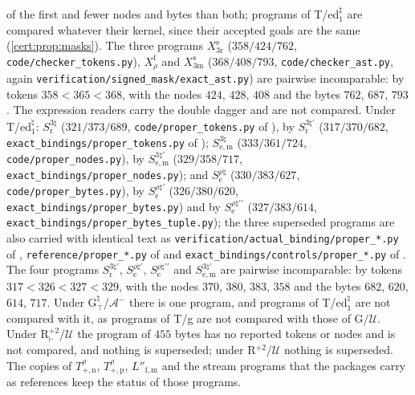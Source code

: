 of the first and fewer nodes and bytes than both; programs of T/ed$_1^{\sharp}$ are compared
whatever their kernel, since their accepted goals are the same
(\cref{cert:prop:masks}). The three programs $X^{\mathrm s}_{3\mathrm r}$ ($358/424/762$,
\texttt{code/checker\_tokens.py}), $X^{\mathrm f}_{\rho}$ and $X^{\mathrm s}_{3\mathrm m}$
($368/408/793$, \texttt{code/checker\_ast.py}, again
\texttt{verification/signed\_mask/exact\_ast.py}) are pairwise incomparable: by tokens
$358<365<368$, with the nodes $424$, $428$, $408$ and the bytes $762$, $687$, $793$. The
expression readers carry the double dagger and are not compared. Under
T/ed$_1^{\natural}$: $S^{3\natural}_{\mathrm r}$ ($321/373/689$, \texttt{code/proper\_tokens.py}
of ), by $S^{3\natural\prime}_{\mathrm r}$ ($317/370/682$,
\texttt{exact\_bindings/proper\_tokens.py} of );
$S^{3\natural}_{\mathrm{e,m}}$ ($333/361/724$, \texttt{code/proper\_nodes.py}), by
$S^{3\natural\prime}_{\mathrm{e,m}}$ ($329/358/717$, \texttt{exact\_bindings/proper\_nodes.py});
and $S^{\rho\natural}_{\mathrm e}$ ($330/383/627$, \texttt{code/proper\_bytes.py}), by
$S^{\rho\natural\prime}_{\mathrm e}$ ($326/380/620$, \texttt{exact\_bindings/proper\_bytes.py})
and by $S^{\rho\natural\prime\prime}_{\mathrm e}$ ($327/383/614$,
\texttt{exact\_bindings/proper\_bytes\_tuple.py}); the three superseded programs are also
carried with identical text as \texttt{verification/actual\_binding/proper\_*.py} of
, \texttt{reference/proper\_*.py} of  and
\texttt{exact\_bindings/controls/proper\_*.py} of . The four
programs $S^{3\natural\prime}_{\mathrm r}$, $S^{\rho\natural\prime}_{\mathrm e}$,
$S^{\rho\natural\prime\prime}_{\mathrm e}$ and $S^{3\natural\prime}_{\mathrm{e,m}}$ are
pairwise incomparable: by tokens $317<326<327<329$, with the nodes $370$, $380$, $383$,
$358$ and the bytes $682$, $620$, $614$, $717$. Under G$^{\natural}_{\top}$/$\mathcal A^{-}$
there is one program, and programs of T/ed$_1^{\natural}$ are not compared with it, as
programs of T/g are not compared with those of G/$\mathcal U$. Under
R$^{+2}_{\vdash}$/$\mathcal U$ the program of $455$ bytes has no reported tokens or nodes
and is not compared, and nothing is superseded; under R$^{+2}$/$\mathcal U$ nothing is
superseded. The copies of $T^{\rho}_{+,\mathrm n}$, $T^{\rho}_{+,\mathrm p}$,
$L''_{\mathrm{f,m}}$ and the stream programs that the packages carry as references keep the
status of those programs.


